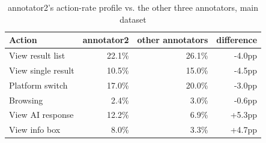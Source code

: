\begin{table}[t]
\centering
\caption{annotator2's action-rate profile vs. the other three annotators, main dataset}
\label{tab:rq5-corroboration}
\begin{tabular}{lrrr}
\toprule
Action & annotator2 & other annotators & difference \\
\midrule
View result list & 22.1\% & 26.1\% & -4.0pp \\
View single result & 10.5\% & 15.0\% & -4.5pp \\
Platform switch & 17.0\% & 20.0\% & -3.0pp \\
Browsing & 2.4\% & 3.0\% & -0.6pp \\
View AI response & 12.2\% & 6.9\% & +5.3pp \\
View info box & 8.0\% & 3.3\% & +4.7pp \\
\bottomrule
\end{tabular}
\end{table}
